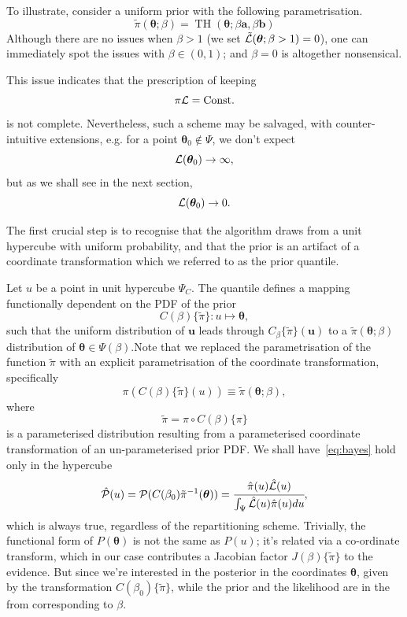 \documentclass[usenatbib]{mnras}
\DeclareMathOperator{\TopHat}{TH}
\begin{document}
To illustrate, consider a uniform prior with the following
parametrisation.
\begin{equation*}
  \tilde{\pi}(\bm{\theta}; \beta) = \TopHat(\bm{\theta}; \beta \bm{a}, \beta \bm{b})
\end{equation*}
Although there are no issues when \(\beta>1\) (we set
\({\cal\tilde{L}}(\bm{\theta}; \beta>1)=0\)), one can immediately
spot the issues with \(\beta \in (0,1)\); and \(\beta=0\) is
altogether nonsensical.

This issue indicates that the prescription of keeping \[\pi {\cal
	L} = \text{Const.}\] is not complete. Nevertheless, such a scheme
may be salvaged, with counter-intuitive extensions, e.g. for a
point \(\bm{\theta}_{0} \notin \Psi\), we don't expect
\[{\cal L}(\bm{\theta}_{0}) \rightarrow \infty,\] but as we shall see in
the next section, \[{\cal L}(\bm{\theta}_{0}) \rightarrow 0.\]

The first crucial step is to recognise that the algorithm draws
from a unit hypercube with uniform probability, and that the prior
is an artifact of a coordinate transformation which we referred to
as the prior quantile.

Let \(u\) be a point in unit hypercube \(\Psi_{C}\). The quantile
defines a mapping functionally dependent on the PDF of the prior
\[C(\beta)\lbrace \tilde{\pi}\rbrace:u \mapsto \bm{\theta},\] such that
the uniform distribution of \(\bm{u}\) leads through
\(C_{\beta}\{\tilde{\pi}\}(\bm{u})\) to a \(\tilde{\pi}(\bm{\theta};\beta)\)
distribution of \(\bm{\theta} \in\Psi(\beta)\).Note that we replaced the
parametrisation of the function \(\tilde{\pi}\) with an explicit
parametrisation of the coordinate transformation, specifically
\begin{equation*}
  \pi(C(\beta)\{\tilde{\pi}\}(u)) \equiv \tilde{\pi}(\bm{\theta}; \beta),
\end{equation*}
where 
\begin{equation*}
  \tilde{\pi} =  \pi \circ C(\beta) \{ \pi \} 
\end{equation*}
is a parameterised distribution resulting from a parameterised
coordinate transformation of an un-parameterised prior PDF. We shall
have~\vref{eq:bayes} hold only in the hypercube
\begin{equation*}
{\cal \hat{P}}(u) = {\cal P}(C(\beta_{0}){\tilde{\pi}}^{-1}(\bm{\theta})) = \cfrac{\hat{\pi} (u) {\cal \hat{L}}(u)}{\int_{\Psi}{\cal \hat{L}}(u) \hat{\pi}(u) du},
\end{equation*}
which is always true, regardless of the repartitioning
scheme. Trivially, the functional form of \(P(\bm{\theta})\) is not the same
as \(P(u)\); it's related via a co-ordinate transform, which in our
case contributes a Jacobian factor \(J(\beta)\{\tilde{\pi}\}\) to the
evidence. But since we're interested in the posterior in the
coordinates \(\bm{\theta}\), given by the transformation \(C(\beta_{0})\{\tilde{\pi}\}\),
while the prior and the likelihood are in the from corresponding
to \(\beta\).
\end{document}
